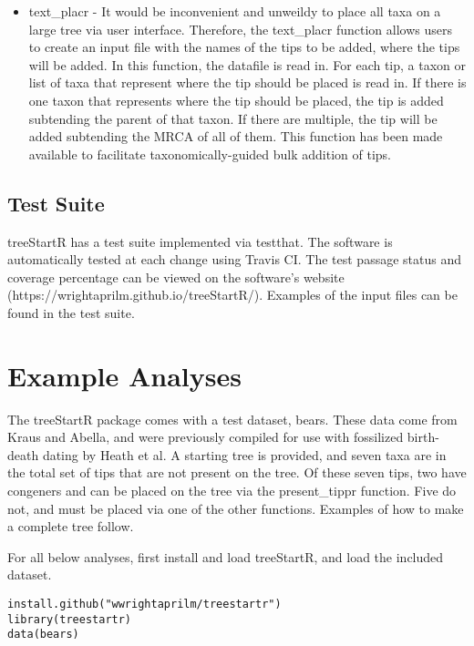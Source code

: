 \begin{itemize}
\item text\_placr - It would be inconvenient and unweildy to place all taxa on a large tree via user interface. 
Therefore, the text\_placr function allows users to create an input file with the names of the tips to be added, where the tips will be added.
In this function, the datafile is read in. 
For each tip, a taxon or list of taxa that represent where the tip should be placed is read in.
If there is one taxon that represents where the tip should be placed, the tip is added subtending the parent of that taxon.
If there are multiple, the tip will be added subtending the MRCA of all of them.
This function has been made available to facilitate taxonomically-guided bulk addition of tips.
\end{itemize}
\subsection{Test Suite}

treeStartR has a test suite implemented via testthat. 
The software is automatically tested at each change using Travis CI. 
The test passage status and coverage percentage can be viewed on the software's website (https://wrightaprilm.github.io/treeStartR/).
Examples of the input files can be found in the test suite.

\section{Example Analyses}

The treeStartR package comes with a test dataset, bears.
These data come from Kraus and Abella, and were previously compiled for use with fossilized birth-death dating by Heath et al.
A starting tree is provided, and seven taxa are in the total set of tips that are not present on the tree.
Of these seven tips, two have congeners and can be placed on the tree via the present\_tippr function.
Five do not, and must be placed via one of the other functions. 
Examples of how to make a complete tree follow. 

For all below analyses, first install and load treeStartR, and load the included dataset.

{\tt \begin{snugshade*}
\begin{lstlisting}
install.github("wwrightaprilm/treestartr")
library(treestartr)
data(bears)
\end{lstlisting}
\end{snugshade*}}

